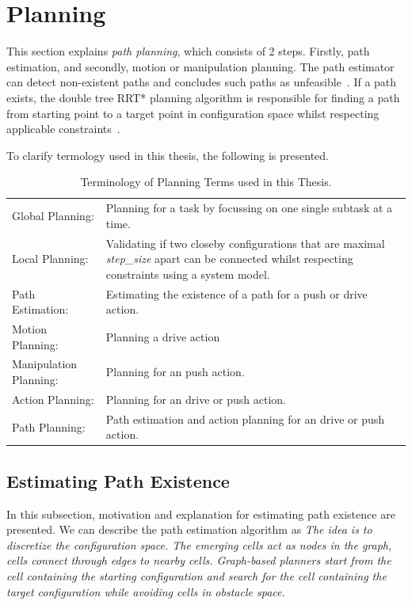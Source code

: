 \section{Planning}%
\label{sec:planning}
This section explains \textit{path planning}, which consists of 2 steps. Firstly, path estimation, and secondly, motion or manipulation planning. The path estimator can detect non-existent paths and concludes such paths as unfeasible~\cite{zhang_simple_2008}. If a path exists, the double tree \ac{RRT*} planning algorithm is responsible for finding a path from starting point to a target point in configuration space whilst respecting applicable constraints~\cite{chen_fast_2018}.\bs

To clarify termology used in this thesis, the following  is presented.\bs
\noindent
\begin{table}[H]
  \centering
  \begin{tabular}%
  {>{\raggedright\arraybackslash}p{}%
   >{\raggedright\arraybackslash}p{}}
  Global Planning:& Planning for a task by focussing on one single subtask at a time. \\
  Local Planning:& Validating if two closeby configurations that are maximal \textit{step\_size} apart can be connected whilst respecting constraints using a system model.\\
  Path Estimation:& Estimating the existence of a path for a push or drive action.\\
  Motion Planning:& Planning a drive action\\
  Manipulation Planning:& Planning for an push action.\\
  Action Planning:& Planning for an drive or push action.\\
  Path Planning:& Path estimation and action planning for an drive or push action.\\
  \end{tabular}
\caption{Terminology of Planning Terms used in this Thesis.}%
\label{table:termology_planning}
\end{table}

\subsection{Estimating Path Existence}%
\label{subsec:path_estimation}
In this subsection, motivation and explanation for estimating path existence are presented. We can describe the path estimation algorithm as \textit{The idea is to discretize the configuration space. The emerging cells act as nodes in the graph, cells connect through edges to nearby cells. Graph-based planners start from the cell containing the starting configuration and search for the cell containing the target configuration while avoiding cells in obstacle space.\bs}


